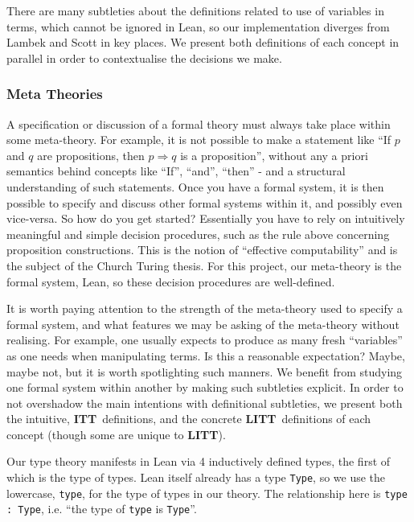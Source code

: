 \documentclass[12pt,leqno]{article}
\def\lc{\lstinline}
\newcommand{\ITT}{\textbf{ITT}}
\newcommand{\LITT}{\textbf{LITT}}
\theoremstyle{example}
\numberwithin{equation}{section}
\begin{document}
There are many subtleties about the definitions related to use of variables in terms, which cannot be ignored in Lean, so our implementation diverges from Lambek and Scott in key places. We present both definitions of each concept in parallel in order to contextualise the decisions we make.



\subsubsection{Meta Theories}

A specification or discussion of a formal theory must always take place within some meta-theory. For example, it is not possible to make a statement like ``If $p$ and $q$ are propositions, then $p \Rightarrow q$ is a proposition'', without any a priori semantics behind concepts like ``If'', ``and'', ``then'' - and a structural understanding of such statements. Once you have a formal system, it is then possible to specify and discuss other formal systems within it, and possibly even vice-versa. So how do you get started? Essentially you have to rely on intuitively meaningful and simple decision procedures, such as the rule above concerning proposition constructions. This is the notion of ``effective computability'' and is the subject of the Church Turing thesis. For this project, our meta-theory is the formal system, Lean, so these decision procedures are well-defined.

It is worth paying attention to the strength of the meta-theory used to specify a formal system, and what features we may be asking of the meta-theory without realising. For example, one usually expects to produce as many fresh ``variables'' as one needs when manipulating terms. Is this a reasonable expectation? Maybe, maybe not, but it is worth spotlighting such manners. We benefit from studying one formal system within another by making such subtleties explicit. In order to not overshadow the main intentions with definitional subtleties, we present both the intuitive, \ITT~definitions, and the concrete \LITT~definitions of each concept (though some are unique to \LITT).

Our type theory manifests in Lean via 4 inductively defined types, the first of which is the type of types. Lean itself already has a type \lc{Type}, so we use the lowercase, \lc{type}, for the type of types in our theory. The relationship here is \lc{type : Type}, i.e. ``the type of \lc{type} is \lc{Type}''.
\end{document}
